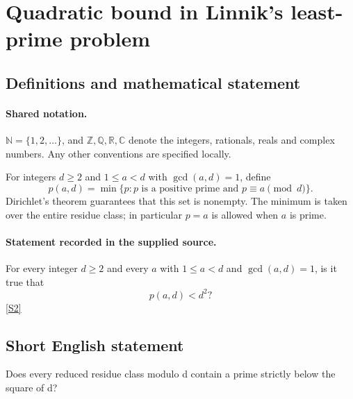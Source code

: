 \documentclass[11pt]{article}
\newcommand{\sref}[2]{\hyperlink{source:#1:#2}{[S#2]}}
\begin{document}
\section{Quadratic bound in Linnik's least-prime problem}\label{statement}

\subsection{Definitions and mathematical statement}

\paragraph{Shared notation.}$\mathbb N=\{1,2,\ldots\}$, and $\mathbb Z,\mathbb Q,\mathbb R,\mathbb C$ denote the integers, rationals, reals and complex numbers. Any other conventions are specified locally.


For integers $d\ge2$ and $1\le a<d$ with $\gcd(a,d)=1$, define
\[p(a,d)=\min\{p:p\text{ is a positive prime and }p\equiv a\pmod d\}.\]
Dirichlet's theorem guarantees that this set is nonempty. The minimum is taken over the entire residue class; in particular $p=a$ is allowed when $a$ is prime.
\paragraph{Statement recorded in the supplied source.}
For every integer $d\ge2$ and every $a$ with $1\le a<d$ and $\gcd(a,d)=1$, is it true that
\[p(a,d)<d^2?\] \sref{statement}{2}
\subsection{Short English statement}
Does every reduced residue class modulo d contain a prime strictly below the square of d?
\end{document}
